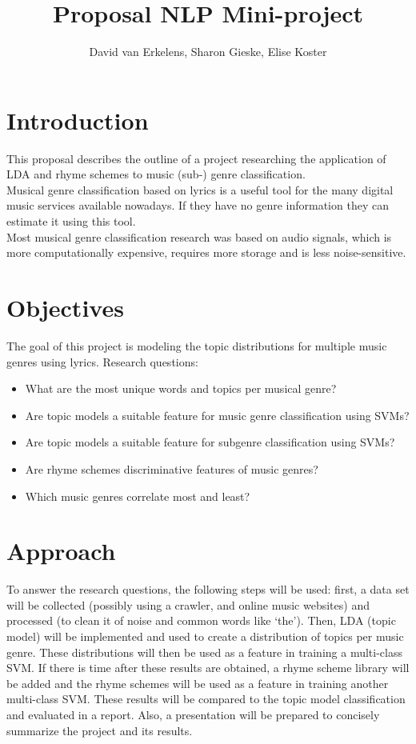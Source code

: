 \documentclass[12pt,a4paper]{amsart}
\title{Proposal NLP Mini-project}
\author{David van Erkelens, Sharon Gieske, Elise Koster}
\date{}
\begin{document}
\maketitle

\section{Introduction}
This proposal describes the outline of a project researching the application of LDA and rhyme schemes to music (sub-) genre classification.\\
Musical genre classification based on lyrics is a useful tool for the many digital music services available nowadays. If they have no genre information they can estimate it using this tool. \\
Most musical genre classification research was based on audio signals, which is more computationally expensive, requires more storage and is less noise-sensitive. \\


\section{Objectives}
The goal of this project is modeling the topic distributions for multiple music genres using lyrics. 
Research questions:
\begin{itemize}
\item What are the most unique words and topics per musical genre?
\item Are topic models a suitable feature for music genre classification using SVMs?
\item Are topic models a suitable feature for subgenre classification using SVMs?
\item Are rhyme schemes discriminative features of music genres?
\item Which music genres correlate most and least?
\end{itemize}

\section{Approach}
To answer the research questions, the following steps will be used: first, a data set will be collected (possibly using a crawler, and online music websites) and processed (to clean it of noise and common words like `the'). Then, LDA (topic model) will be implemented and used to create a distribution of topics per music genre. These distributions will then be used as a feature in training a multi-class SVM. If there is time after these results are obtained, a rhyme scheme library will be added and the rhyme schemes will be used as a feature in training another multi-class SVM. These results will be compared to the topic model classification and evaluated in a report. Also, a presentation will be prepared to concisely summarize the project and its results.
\end{document}
